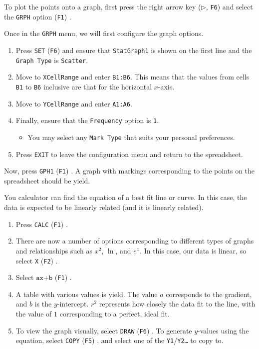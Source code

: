 \documentclass[a5paper,draft]{memoir}
\def\code#1{\texttt{#1}}
\def\Fone{(\code{F1}) }
\def\Ftwo{(\code{F2}) }
\def\Ffive{(\code{F5}) }
\def\Fsix{(\code{F6}) }
\begin{document}
To plot the points onto a graph, first press the right arrow key ($\triangleright$, \code{F6}) and select the \code{GRPH} option \Fone.

Once in the \code{GRPH} menu, we will first configure the graph options. 
\begin{enumerate}
	\item Press \code{SET} \Fsix and ensure that \code{StatGraph1} is shown on the first line and the \code{Graph Type} is \code{Scatter}.
	\item Move to \code{XCellRange} and enter \code{B1:B6}. This means that the values from cells \code{B1} to \code{B6} inclusive are that for the horizontal $x$-axis.
	\item Move to \code{YCellRange} and enter \code{A1:A6}.
	\item Finally, ensure that the \code{Frequency} option is \code{1}.
	\begin{itemize}
		\item You may select any \code{Mark Type} that suits your personal preferences.
	\end{itemize}
	\item Press \code{EXIT} to leave the configuration menu and return to the spreadsheet.
\end{enumerate}

Now, press \code{GPH1} \Fone. A graph with markings corresponding to the points on the spreadsheet should be yield.

You calculator can find the equation of a best fit line or curve. In this case, the data is expected to be linearly related (and it is linearly related).

\begin{enumerate}
	\item Press \code{CALC} \Fone.
	\item There are now a number of options corresponding to different types of graphs and relationships such as $x^2$, $\ln$, and $e^x$. In this case, our data is linear, so select \code{X} \Ftwo.
	\item Select $\code{ax+b}$ \Fone.
	\item A table with various values is yield. The value $a$ corresponds to the gradient, and $b$ is the $y$-intercept. $r^2$ represents how closely the data fit to the line, with the value of $1$ corresponding to a perfect, ideal fit.
	\item To view the graph visually, select \code{DRAW} \Fsix. To generate $y$-values using the equation, select \code{COPY} \Ffive, and select one of the \code{Y1}/\code{Y2\dots} to copy to.
\end{enumerate}
\end{document}
